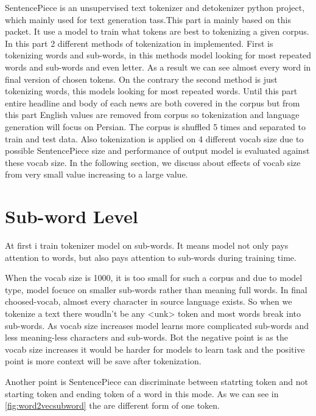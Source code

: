 \label{chapter:literature}

SentencePiece is an unsupervised text tokenizer and detokenizer python project, which mainly used for text generation tass.This part ia mainly based on this packet. It use a model to train what tokens are best to tokenizing a given corpus. In this part 2 different methods of tokenization in implemented. First is tokenizing words and sub-words, in this methods model looking for most repeated words and sub-words and even letter. As a result we can see almost every word in final version of chosen tokens. On the contrary the second method is just tokenizing words, this models looking for most repeated words. 
\newline
Until this part entire headline and body of each news are both covered in the corpus but from this part English values are removed from corpus so tokenization and language generation will focus on Persian. 
\newline
The corpus is shuffled 5 times and separated to train and test data. Also tokenization is applied on 4 different vocab size due to possible SentencePiece size and performance of output model is evaluated against these vocab size. In the following section, we discuss about effects of vocab size from very small value increasing to a large value.
\newline

\section{Sub-word Level}
At first i train tokenizer model on sub-words. It means model not only pays attention to words, but also pays attention to sub-words during training time. 

When the vocab size is 1000, it is too small for such a corpus and due to model type, model focuce on smaller sub-words rather than meaning full words. In final choosed-vocab, almost every character in source language exists. So when we tokenize a text there woudln't be any <unk> token and most words break into sub-words. 
\newline
As vocab size increases model learns more complicated sub-words and less meaning-less characters and sub-words. Bot the negative point is as the vocab size increases it would be harder for models to learn task and the positive point is more context will be save after tokenization.

Another point is SentencePiece can discriminate between statrting token and not starting token and ending token of a word in this mode. As we can see in \ref{fig:word2vecsubword} the are different form of one token.

